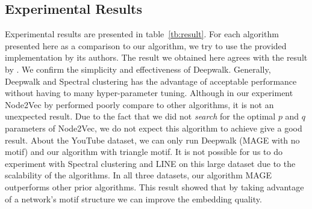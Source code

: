 \documentclass[letterpaper]{article}
\begin{document}
        \subsection{Experimental Results}

            Experimental results are presented in table~\ref{tb:result}. For each algorithm
            presented here as a comparison to our algorithm, we try to use the provided implementation
            by its authors. The result we obtained here agrees with the result by \cite{deepwalk}.
            We confirm the simplicity and effectiveness of Deepwalk. Generally, Deepwalk and
            Spectral clustering has the advantage of acceptable performance without having 
            to many hyper-parameter tuning. Although in our experiment Node2Vec by \cite{node2vec} 
            performed poorly compare to other algorithms, it is not an unexpected result. Due to the
            fact that we did not \emph{search} for the optimal $p$ and $q$ parameters of Node2Vec,
            we do not expect this algorithm to achieve give a good result. About the YouTube
            dataset, we can only run Deepwalk (MAGE with no motif) and our algorithm with triangle
            motif. It is not possible for us to do experiment with Spectral clustering and LINE on
            this large dataset due to the scalability of the algorithms. 
            In all three datasets, our algorithm MAGE outperforms other prior algorithms. This result
            showed that by taking advantage of a network's motif structure we can improve the embedding
            quality. 

            \begin{table}
                \centering
                \label{tb:result}
                \caption{Weighted f1-macro score.}
            \end{table}
\end{document}

